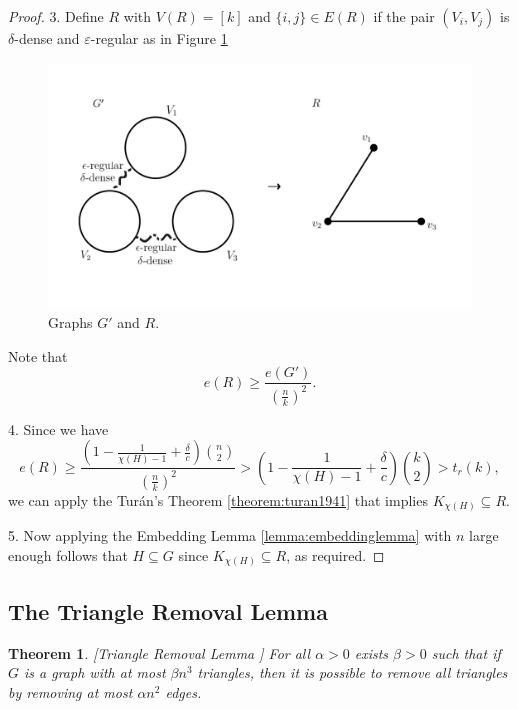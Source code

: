 \documentclass[12pt,twoside,a4paper,bibliography=totocnumbered]{book}
\numberwithin{equation}{section}
\newtheorem{theorem}             {Theorem}[section]
\theoremstyle{remark}
\begin{document}
\begin{proof}
3. Define $R$ with $V(R) = [k]$ and $\{i,j\} \in E(R) $ if  the pair $(V_i, V_j)$ is $\delta$-dense and $\varepsilon$-regular as in Figure \ref{fig:graph-G'-and-R}

\begin{figure}[H]
     \centering
     \includegraphics[scale=1.5]{Figuras/graph-G'-and-R.jpg}
     \caption{Graphs $G'$ and $R$.}
     \label{fig:graph-G'-and-R}
\end{figure}

Note that
$$e(R) \geq \frac{e(G')}{\left(\frac{n}{k}\right)^2}.$$

4. Since we have
$$e(R) \geq \frac{\left(1 - \frac{1}{\chi(H) - 1} + \frac{\delta}{c}\right) \binom{n}{2}}{\left(\frac{n}{k}\right)^2} > \left( 1 - \frac{1}{\chi(H) - 1} + \frac{\delta}{c}\right) \binom{k}{2}> t_r(k),$$
we can apply the Turán's Theorem \ref{theorem:turan1941} that implies $K_{\chi (H)} \subseteq R$.

5. Now applying the Embedding Lemma \ref{lemma:embeddinglemma} with $n$ large enough follows that $H \subseteq G$ since $K_{\chi (H)} \subseteq R$, as required.

\end{proof}

\subsection{The Triangle Removal Lemma}
\begin{theorem}\label{lemma:triangleremoval}\emph{[}{Triangle Removal Lemma \cite{RuSz76}}\emph{]}
For all $\alpha > 0$ exists $\beta > 0$ such that if $G$ is a graph with at most $\beta n^3$ triangles, then it is possible to remove all triangles by removing at most $\alpha n^2$ edges. 
\end{theorem}
\end{document}
